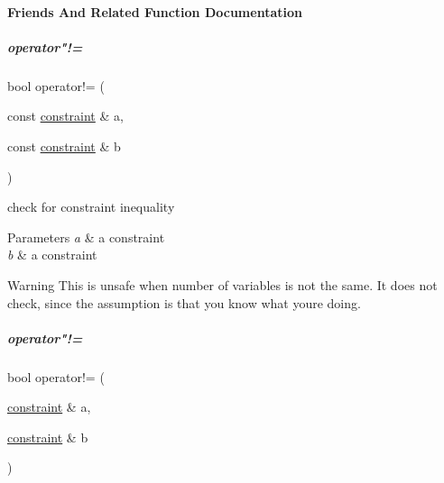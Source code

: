 \paragraph{Friends And Related Function Documentation}
\mbox{\label{group___c_l_s_solvers_a6b57d19474acdea10ab0a0e954ef3ef9}} 
\subparagraph{\texorpdfstring{operator"!=}{operator!=}\hspace{0.1cm}{\footnotesize\ttfamily [1/2]}}
{\footnotesize\ttfamily bool operator!= (\begin{DoxyParamCaption}\item[{const \hyperlink{group___c_l_s_solvers_classconstraint}{constraint} \&}]{a,  }\item[{const \hyperlink{group___c_l_s_solvers_classconstraint}{constraint} \&}]{b }\end{DoxyParamCaption})\hspace{0.3cm}{\ttfamily [friend]}}



check for constraint inequality 


\begin{DoxyParams}{Parameters}
{\em a} & a constraint \\
\hline
{\em b} & a constraint \\
\hline
\end{DoxyParams}
\begin{DoxyWarning}{Warning}
This is unsafe when number of variables is not the same. It does not check, since the assumption is that you know what you\textquotesingle{}re doing. 
\end{DoxyWarning}
\mbox{\label{group___c_l_s_solvers_a75ee7037f652ba94155890c109b88ef8}} 
\subparagraph{\texorpdfstring{operator"!=}{operator!=}\hspace{0.1cm}{\footnotesize\ttfamily [2/2]}}
{\footnotesize\ttfamily bool operator!= (\begin{DoxyParamCaption}\item[{\hyperlink{group___c_l_s_solvers_classconstraint}{constraint} \&}]{a,  }\item[{\hyperlink{group___c_l_s_solvers_classconstraint}{constraint} \&}]{b }\end{DoxyParamCaption})\hspace{0.3cm}{\ttfamily [friend]}}



